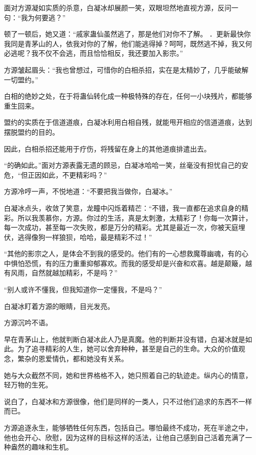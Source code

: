 
\begin{this_body}

面对方源凝如实质的杀意，白凝冰却展颜一笑，双眼坦然地直视方源，反问一句：“我为何要逃？”

顿了一顿后，她又道：“戚家蛊仙虽然逃了，那是他们对你不了解。 ．更新最快你我同是青茅山的人，依我对你的了解，他们能逃得掉？呵呵，既然逃不掉，我又何必逃呢？我不仅不会逃，而且恰恰相反，我还要加入影宗。”

方源皱起眉头：“我也曾想过，可惜你的白相杀招，实在是太精妙了，几乎能破解一切盟约。”

白相的绝妙之处，在于将蛊仙转化成一种极特殊的存在，任何一小块残片，都能够重生回来。

盟约的实质在于信道道痕，白凝冰利用白相自残，就能甩开相应的信道道痕，达到摆脱盟约的目的。

因此，白相杀招还能用于疗伤，将残留在身上的其他道痕排遣出去。

“的确如此。”面对方源表露无遗的顾忌，白凝冰哈哈一笑，丝毫没有担忧自己的安危，“但正因如此，不更精彩吗？”

方源冷哼一声，不悦地道：“不要把我当做你，白凝冰。”

白凝冰点头，收敛了笑意，龙瞳中闪烁着精芒：“不错，我一直都在追求自身的精彩。所以我羡慕你，方源。你过的生活，真是太刺激，太精彩了！你每一次算计，每一次成功，甚至每一次失败，都是万分的精彩。尤其是最近一次，你被天庭埋伏，逃得像狗一样狼狈，哈哈，最是精彩不过！”

“其他的影宗之人，是体会不到我的感受的。他们有的一心想救魔尊幽魂，有的心中惧怕恐慌，有的压力重重抑郁寡欢。而我的感受却是兴奋和欢喜。越是颠簸，越有风雨，自然就越加精彩，不是吗？”

“别人或许不懂我，但我知道你一定懂我，不是吗？”

白凝冰盯着方源的眼睛，目光发亮。

方源沉吟不语。

早在青茅山上，他就判断白凝冰此人乃是真魔。他的判断并没有错，白凝冰就是如此。为了追寻精彩的人生，她可以舍弃种种，甚至是自己的生命。大众的价值观念，繁杂的恩爱情仇，都和她没有关系。

她与大众截然不同，她和世界格格不入，她只照着自己的轨迹走。纵内心的情意，轻万物的生死。

说白了，白凝冰和方源很像，他们是同样的一类人，只不过他们追求的东西不一样而已。

方源追逐永生，能够牺牲任何东西，包括自己。哪怕最终不成功，死在半途之中，他也会开心、欣慰，因为这样的目标这样的活法，让他自己感到自己活着充满了一种盎然的趣味和生机。


\end{this_body}
